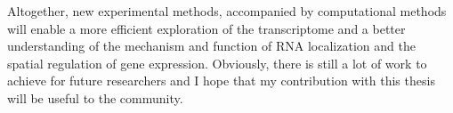 









Altogether, new experimental methods, accompanied by computational methods will enable a more efficient exploration of the transcriptome and a better understanding of the mechanism and function of RNA localization and the spatial regulation of gene expression.
Obviously, there is still a lot of work to achieve for future researchers and I hope that my contribution with this thesis will be useful to the community.

